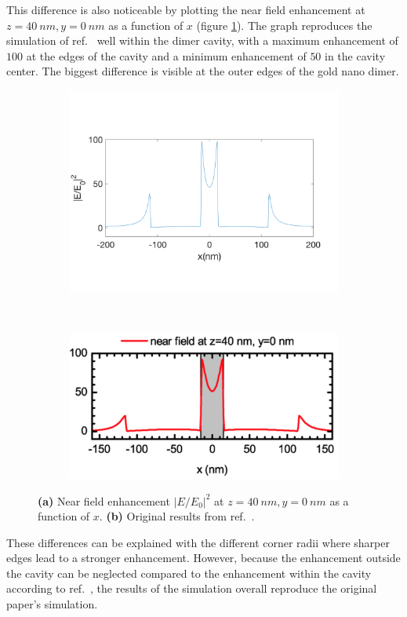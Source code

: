 This difference is also noticeable by plotting the near field enhancement at $z = \SI{40}{nm}, y = \SI{0}{nm}$ as a function of $x$ (figure \ref{fig:yline}). The graph reproduces the simulation of ref.~\cite{heeg} well within the dimer cavity, with a maximum enhancement of $100$ at the edges of the cavity and a minimum enhancement of $50$ in the cavity center. The biggest difference is visible at the outer edges of the gold nano dimer.

\begin{figure}[!h]
  \centering
  \begin{subfigure}{0.45\textwidth}
    \includegraphics[width=\textwidth]{./images/40nm-y.png}
  \end{subfigure}
  ~
  \begin{subfigure}{0.45\textwidth}
    \includegraphics[width=\textwidth]{./images/heeg-y-line.png}
  \end{subfigure}
  \caption{\textbf{(a)} Near field enhancement $|E/E_0|^2$ at $z = \SI{40}{nm}, y = \SI{0}{nm}$ as a function of $x$. \textbf{(b)} Original results from ref.~\cite{heeg}.}
  \label{fig:yline}
\end{figure}

These differences can be explained with the different corner radii where sharper edges lead to a stronger enhancement. However, because the  enhancement outside the cavity can be neglected compared to the enhancement within the cavity according to ref.~\cite{heeg}, the results of the simulation overall reproduce the original paper's simulation.

